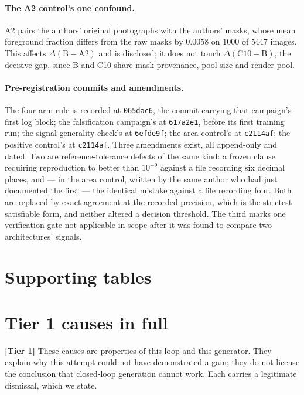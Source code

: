 \documentclass{article} %
\begin{document}
\paragraph{The A2 control's one confound.} A2 pairs the authors' original photographs with the
authors' masks, whose mean foreground fraction differs from the raw masks by $0.0058$ on $1000$ of
$5447$ images. This affects $\Delta(\mathrm{B}-\mathrm{A2})$ and is disclosed; it does not touch
$\Delta(\mathrm{C10}-\mathrm{B})$, the decisive gap, since B and C10 share mask provenance, pool size
and render pool.

\paragraph{Pre-registration commits and amendments.} The four-arm rule is recorded at
\texttt{065dac6}, the commit carrying that campaign's first log block; the falsification campaign's at
\texttt{617a2e1}, before its first training run; the signal-generality check's at \texttt{6efde9f};
the area control's at \texttt{c2114af}; the positive control's at \texttt{c2114af}. Three amendments
exist, all append-only and dated. Two are reference-tolerance defects of the same kind: a frozen clause
requiring reproduction to better than $10^{-9}$ against a file recording six decimal places, and --- in
the area control, written by the same author who had just documented the first --- the identical
mistake against a file recording four. Both are replaced by exact agreement at the recorded precision,
which is the strictest satisfiable form, and neither altered a decision threshold. The third marks one
verification gate not applicable in scope after it was found to compare two architectures' signals.

\section{Supporting tables}
\label{app:tables}



\section{Tier 1 causes in full}
\label{app:tier1}

\textbf{[Tier 1]} These causes are properties of this loop and this generator. They explain why this
attempt could not have demonstrated a gain; they do not license the conclusion that closed-loop
generation cannot work. Each carries a legitimate dismissal, which we state.
\end{document}
